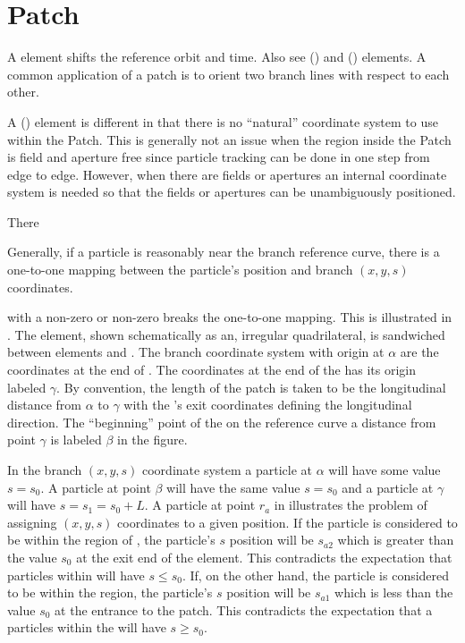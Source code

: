 \section{Patch}
\label{s:patch}

A  element shifts the reference orbit and time. Also see 
() and  () elements. A common application of a patch
is to orient two branch lines with respect to each other. 


A  () element is different in that there is no ``natural'' coordinate 
system to use within the Patch. This is generally not an issue when the region inside the
Patch is field and aperture free since particle tracking can be done in one step from edge
to edge. However, when there are fields or apertures an internal
coordinate system is needed so that the fields or apertures can be unambiguously positioned.



There 


Generally, if a particle is reasonably near the branch reference curve, there is a one-to-one mapping
between the particle's position and branch $(x, y, s)$ coordinates. 


with a non-zero  or non-zero  breaks the one-to-one mapping. This is
illustrated in .  The  element, shown schematically as an, irregular
quadrilateral, is sandwiched between elements  and . The branch coordinate system
with origin at $\alpha$ are the coordinates at the end of . The coordinates at the end of
the  has its origin labeled $\gamma$. By convention, the length of the patch  is
taken to be the longitudinal distance from $\alpha$ to $\gamma$ with the 's exit
coordinates defining the longitudinal direction. The ``beginning'' point of the  on the
reference curve a distance  from point $\gamma$ is labeled $\beta$ in the figure.

In the branch $(x, y, s)$ coordinate system a particle at $\alpha$ will have some value $s = s_0$. A
particle at point $\beta$ will have the same value $s = s_0$ and a particle at $\gamma$ will have $s
= s_1 = s_0 + L$. A particle at point $r_a$ in  illustrates the problem of
assigning $(x, y, s)$ coordinates to a given position. If the particle is considered to be within
the region of , the particle's $s$ position will be $s_{a2}$ which is greater than the
value $s_0$ at the exit end of the element. This contradicts the expectation that particles within
 will have $s \le s_0$.  If, on the other hand, the particle is considered to be within
the  region, the particle's $s$ position will be $s_{a1}$ which is less than the value
$s_0$ at the entrance to the patch. This contradicts the expectation that a particles within the
 will have $s \ge s_0$.

